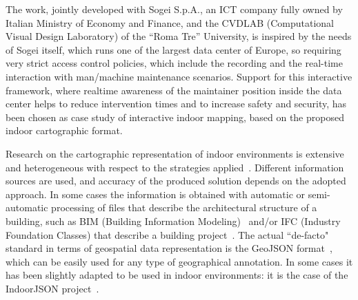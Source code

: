 \documentclass[]{egpubl}
\begin{document}
The work, jointly developed with Sogei S.p.A., an ICT company fully owned by Italian Ministry of Economy and Finance, and the CVDLAB (Computational Visual Design Laboratory) of the ``Roma Tre'' University, is inspired by the needs of Sogei itself, which runs one of the largest data center of Europe, so requiring very strict access control policies, which include the recording and the real-time interaction with man/machine maintenance scenarios. Support for this interactive framework, where realtime awareness of the maintainer position inside the data center helps to reduce intervention times and to increase safety and security, has been chosen as case study of interactive indoor mapping, based on the proposed indoor cartographic format.

Research on the cartographic representation of indoor environments is
extensive and heterogeneous with respect to the strategies
applied~\cite{6418876}. Different information sources are used, and accuracy
of the produced solution depends on the adopted approach. In some cases the
information is obtained with automatic or semi-automatic processing of files
that describe the architectural structure of a building, such as BIM (Building
Information Modeling)~\cite{Eastman:2008:BHG:1796500} and/or IFC (Industry
Foundation Classes) that describe a building project~\cite{6816739}.  The actual ``de-facto" 
standard in terms of geospatial data representation is the GeoJSON
format~\cite{geojson:2008}, which can be easily used for any type of geographical annotation. In
some cases it has been slightly adapted to be used in indoor environments: it
is the case of the IndoorJSON project~\cite{indoorjson:2013}.
\end{document}
